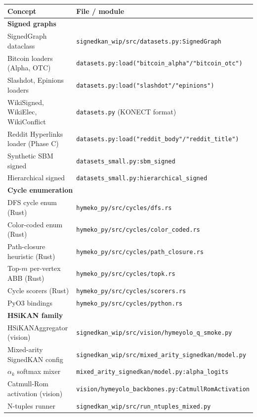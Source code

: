 \documentclass[11pt,a4paper]{article}
\theoremstyle{remark}
\begin{document}
\begin{center}
\small
\begin{tabular}{p{6cm}p{8cm}}
\toprule
\textbf{Concept} & \textbf{File / module} \\
\midrule
\multicolumn{2}{l}{\textbf{Signed graphs}} \\
SignedGraph dataclass & \texttt{signedkan\_wip/src/datasets.py:SignedGraph} \\
Bitcoin loaders (Alpha, OTC) & \texttt{datasets.py:load("bitcoin\_alpha"/"bitcoin\_otc")} \\
Slashdot, Epinions loaders & \texttt{datasets.py:load("slashdot"/"epinions")} \\
WikiSigned, WikiElec, WikiConflict & \texttt{datasets.py} (KONECT format) \\
Reddit Hyperlinks loader (Phase C) & \texttt{datasets.py:load("reddit\_body"/"reddit\_title")} \\
Synthetic SBM signed & \texttt{datasets\_small.py:sbm\_signed} \\
Hierarchical signed & \texttt{datasets\_small.py:hierarchical\_signed} \\
\midrule
\multicolumn{2}{l}{\textbf{Cycle enumeration}} \\
DFS cycle enum (Rust) & \texttt{hymeko\_py/src/cycles/dfs.rs} \\
Color-coded enum (Rust) & \texttt{hymeko\_py/src/cycles/color\_coded.rs} \\
Path-closure heuristic (Rust) & \texttt{hymeko\_py/src/cycles/path\_closure.rs} \\
Top-$m$ per-vertex ABB (Rust) & \texttt{hymeko\_py/src/cycles/topk.rs} \\
Cycle scorers (Rust) & \texttt{hymeko\_py/src/cycles/scorers.rs} \\
PyO3 bindings & \texttt{hymeko\_py/src/cycles/python.rs} \\
\midrule
\multicolumn{2}{l}{\textbf{HSiKAN family}} \\
HSiKANAggregator (vision) & \texttt{signedkan\_wip/src/vision/hymeyolo\_q\_smoke.py} \\
Mixed-arity SignedKAN config & \texttt{signedkan\_wip/src/mixed\_arity\_signedkan/model.py} \\
$\alpha_k$ softmax mixer & \texttt{mixed\_arity\_signedkan/model.py:alpha\_logits} \\
Catmull-Rom activation (vision) & \texttt{vision/hymeyolo\_backbones.py:CatmullRomActivation} \\
N-tuples runner & \texttt{signedkan\_wip/src/run\_ntuples\_mixed.py} \\

\end{tabular}
\end{center}
\end{document}
